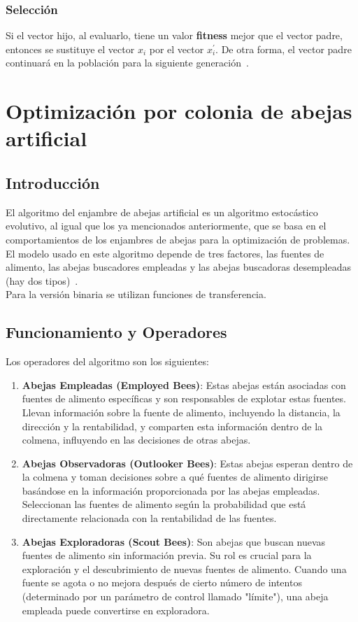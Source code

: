 \subsubsection{Selección}
Si el vector hijo, al evaluarlo, tiene un valor \textbf{fitness} mejor que el vector padre, entonces se sustituye el vector $x_i$ por el vector $x^\prime_i$. De otra forma, el vector padre continuará en la población para la siguiente generación~\cite{storn_differential_1997}.

\section{Optimización por colonia de abejas artificial}
\subsection{Introducción}
El algoritmo del enjambre de abejas artificial es un algoritmo estocástico evolutivo, al igual que los ya mencionados anteriormente, que se basa en el comportamientos de los enjambres de abejas para la optimización de problemas. El modelo usado en este algoritmo depende de tres factores, las fuentes de alimento, las abejas buscadores empleadas y las abejas buscadoras desempleadas (hay dos tipos)~\cite{karaboga_idea_nodate}.\\[6pt]
Para la versión binaria se utilizan funciones de transferencia.

\subsection{Funcionamiento y Operadores}
Los operadores del algoritmo son los siguientes:
\begin{enumerate}
    \item \textbf{Abejas Empleadas (Employed Bees)}: Estas abejas están asociadas con fuentes de alimento específicas y son responsables de explotar estas fuentes. Llevan información sobre la fuente de alimento, incluyendo la distancia, la dirección y la rentabilidad, y comparten esta información dentro de la colmena, influyendo en las decisiones de otras abejas.

    \item \textbf{Abejas Observadoras (Outlooker Bees)}: Estas abejas esperan dentro de la colmena y toman decisiones sobre a qué fuentes de alimento dirigirse basándose en la información proporcionada por las abejas empleadas. Seleccionan las fuentes de alimento según la probabilidad que está directamente relacionada con la rentabilidad de las fuentes.

    \item \textbf{Abejas Exploradoras (Scout Bees)}: Son abejas que buscan nuevas fuentes de alimento sin información previa. Su rol es crucial para la exploración y el descubrimiento de nuevas fuentes de alimento. Cuando una fuente se agota o no mejora después de cierto número de intentos (determinado por un parámetro de control llamado "límite"), una abeja empleada puede convertirse en exploradora.
\end{enumerate}

